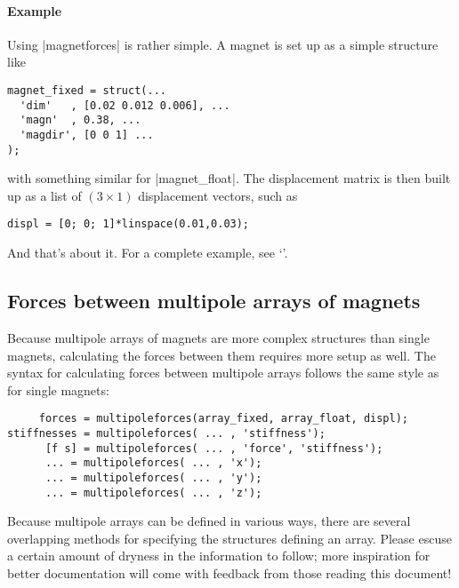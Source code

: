 \documentclass{article}
\begin{document}
\paragraph{Example} Using |magnetforces| is rather simple. A magnet is set up
as a simple structure like
\begin{verbatim}
magnet_fixed = struct(...
  'dim'   , [0.02 0.012 0.006], ...
  'magn'  , 0.38, ...
  'magdir', [0 0 1] ...
);
\end{verbatim}
with something similar for |magnet_float|. The displacement matrix is then
built up as a list of $(3\times1)$ displacement vectors, such as
\begin{verbatim}
displ = [0; 0; 1]*linspace(0.01,0.03);
\end{verbatim}
And that's about it.
For a complete example, see `'.

\subsection{Forces between multipole arrays of magnets}

Because multipole arrays of magnets are more complex structures than single magnets, calculating the forces between them requires more setup as well.
The syntax for calculating forces between multipole arrays follows the same style as for single magnets:

\begin{verbatim}
     forces = multipoleforces(array_fixed, array_float, displ);
stiffnesses = multipoleforces( ... , 'stiffness');
      [f s] = multipoleforces( ... , 'force', 'stiffness');
      ... = multipoleforces( ... , 'x');
      ... = multipoleforces( ... , 'y');
      ... = multipoleforces( ... , 'z');
\end{verbatim}

Because multipole arrays can be defined in various ways, there are several
overlapping methods for specifying the structures defining an array. Please escuse a certain amount of dryness in the information to follow; more inspiration for better documentation will come with feedback from those reading this document!
\end{document}
